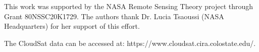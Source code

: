\documentclass{ametsocV6.1}
\begin{document}

%


%

\clearpage
\acknowledgments
This work was supported by the NASA Remote Sensing Theory project through Grant 80NSSC20K1729. 
The authors thank Dr. Lucia Tsaoussi (NASA Headquarters) for her support of this effort.

% 
%
\datastatement
The CloudSat data can be accessed at: https://www.cloudsat.cira.colostate.edu/.
\end{document}
